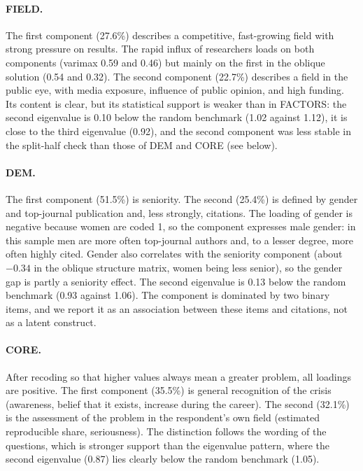 \documentclass[11pt,a4paper]{article}
\begin{document}
\paragraph{FIELD.} The first component (27.6\%) describes a competitive, fast-growing field with strong pressure on results. The rapid influx of researchers loads on both components (varimax 0.59 and 0.46) but mainly on the first in the oblique solution (0.54 and 0.32). The second component (22.7\%) describes a field in the public eye, with media exposure, influence of public opinion, and high funding. Its content is clear, but its statistical support is weaker than in FACTORS: the second eigenvalue is 0.10 below the random benchmark (1.02 against 1.12), it is close to the third eigenvalue (0.92), and the second component was less stable in the split-half check than those of DEM and CORE (see below).

\paragraph{DEM.} The first component (51.5\%) is seniority. The second (25.4\%) is defined by gender and top-journal publication and, less strongly, citations. The loading of gender is negative because women are coded 1, so the component expresses male gender: in this sample men are more often top-journal authors and, to a lesser degree, more often highly cited. Gender also correlates with the seniority component (about $-0.34$ in the oblique structure matrix, women being less senior), so the gender gap is partly a seniority effect. The second eigenvalue is 0.13 below the random benchmark (0.93 against 1.06). The component is dominated by two binary items, and we report it as an association between these items and citations, not as a latent construct.

\paragraph{CORE.} After recoding so that higher values always mean a greater problem, all loadings are positive. The first component (35.5\%) is general recognition of the crisis (awareness, belief that it exists, increase during the career). The second (32.1\%) is the assessment of the problem in the respondent's own field (estimated reproducible share, seriousness). The distinction follows the wording of the questions, which is stronger support than the eigenvalue pattern, where the second eigenvalue (0.87) lies clearly below the random benchmark (1.05).
\end{document}
